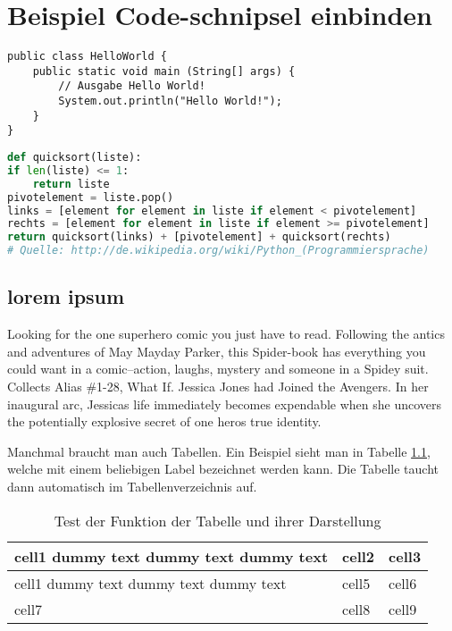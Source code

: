
\chapter{Beispiel Code-schnipsel einbinden}


\begin{lstlisting}[caption=Code-Beispiel, label=Bsp.1]
public class HelloWorld {
	public static void main (String[] args) {
		// Ausgabe Hello World!
		System.out.println("Hello World!");
	}
}
\end{lstlisting}

\begin{lstlisting}[caption=Python-Code, label=Python-Code, title=Titel des Python-Codes,language=Python]
def quicksort(liste):
if len(liste) <= 1:
	return liste
pivotelement = liste.pop()
links = [element for element in liste if element < pivotelement]
rechts = [element for element in liste if element >= pivotelement]
return quicksort(links) + [pivotelement] + quicksort(rechts)
# Quelle: http://de.wikipedia.org/wiki/Python_(Programmiersprache)
\end{lstlisting}

\section{lorem ipsum}
Looking for the one superhero comic you just have to read. Following the antics and adventures of May Mayday Parker, this Spider-book has everything you could want in a comic--action, laughs, mystery and someone in a Spidey suit. Collects Alias \#1-28, What If. Jessica Jones had Joined the Avengers. In her inaugural arc, Jessicas life immediately becomes expendable when she uncovers the potentially explosive secret of one heros true identity. 

Manchmal braucht man auch Tabellen. Ein Beispiel sieht man in Tabelle \ref{tabelle1}, welche mit einem beliebigen Label bezeichnet werden kann. Die Tabelle taucht dann automatisch im Tabellenverzeichnis auf.

\begin{table}[h!]
\begin{center}
\begin{tabular}{ | m{5cm} | m{1cm}| m{1cm} | } 
\hline
cell1 dummy text dummy text dummy text& cell2 & cell3 \\ 
\hline
cell1 dummy text dummy text dummy text & cell5 & cell6 \\ 
\hline
cell7 & cell8 & cell9 \\ 
\hline
\end{tabular}
\end{center}
\caption{Test der Funktion der Tabelle und ihrer Darstellung}
\label{tabelle1}
\end{table}


